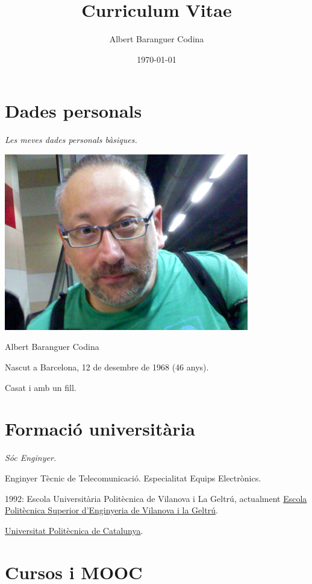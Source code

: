 \documentclass[11pt]{article}
\title{Curriculum  Vitae}
\author{Albert Baranguer Codina}
\date{\today}
\begin{document}
\maketitle

\setcounter{tocdepth}{3}
\tableofcontents
\vspace*{1cm}

\section{Dades personals}
\label{sec-1}

\emph{Les meves dades personals bàsiques.}

\includegraphics[width=.9\linewidth]{./img/albert_baranguer_codina_mq.png}

Albert Baranguer Codina

Nascut a Barcelona, 12 de desembre de 1968 (46 anys).

Casat i amb un fill.
\section{Formació universitària}
\label{sec-2}

\emph{Sóc Enginyer.}

Enginyer Tècnic de Telecomunicació. Especialitat Equips Electrònics.

1992: Escola Universitària Politècnica de Vilanova i La Geltrú, actualment \href{http://www.epsevg.upc.edu/}{Escola Politècnica Superior d'Enginyeria de Vilanova i la Geltrú}.

\href{http://www.upc.edu/?set_language=ca}{Universitat Politècnica de Catalunya}.
\section{Cursos i MOOC}
\label{sec-3}
\end{document}
